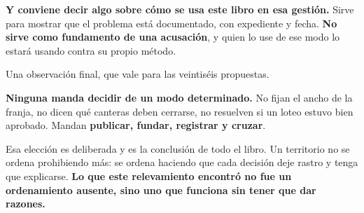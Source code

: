 \textbf{Y conviene decir algo sobre cómo se usa este libro en esa gestión.} Sirve para mostrar
que el problema está documentado, con expediente y fecha. \textbf{No sirve como fundamento de
una acusación}, y quien lo use de ese modo lo estará usando contra su propio método.

\begin{cautela}
Una observación final, que vale para las veintiséis propuestas.

\textbf{Ninguna manda decidir de un modo determinado.} No fijan el ancho de la franja, no
dicen qué canteras deben cerrarse, no resuelven si un loteo estuvo bien aprobado. Mandan
\textbf{publicar, fundar, registrar y cruzar}.

Esa elección es deliberada y es la conclusión de todo el libro. Un territorio no se ordena
prohibiendo más: se ordena haciendo que cada decisión deje rastro y tenga que explicarse.
\textbf{Lo que este relevamiento encontró no fue un ordenamiento ausente, sino uno que
funciona sin tener que dar razones.}
\end{cautela}
